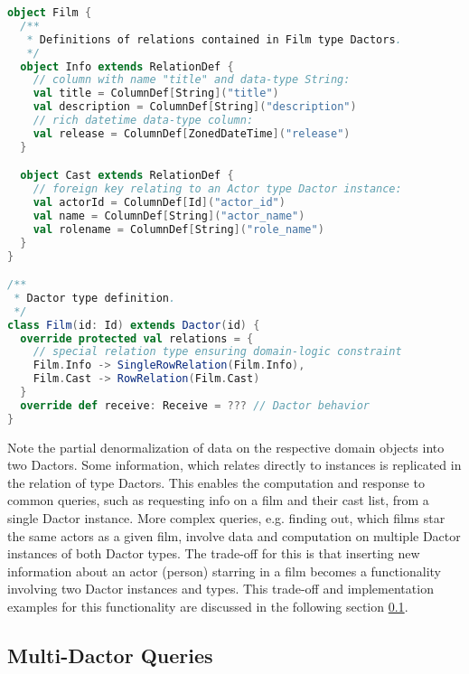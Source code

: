 \begin{lstlisting}[caption=Film Dactor type definition using the actordb framework, label=lst:film_definition, language=Scala]
object Film {
  /**
   * Definitions of relations contained in Film type Dactors.
   */
  object Info extends RelationDef {
    // column with name "title" and data-type String:
    val title = ColumnDef[String]("title")
    val description = ColumnDef[String]("description")
    // rich datetime data-type column:
    val release = ColumnDef[ZonedDateTime]("release")
  }

  object Cast extends RelationDef {
    // foreign key relating to an Actor type Dactor instance:
    val actorId = ColumnDef[Id]("actor_id")
    val name = ColumnDef[String]("actor_name")
    val rolename = ColumnDef[String]("role_name")
  }
} 

/**
 * Dactor type definition.
 */
class Film(id: Id) extends Dactor(id) {
  override protected val relations = {
    // special relation type ensuring domain-logic constraint
    Film.Info -> SingleRowRelation(Film.Info),
    Film.Cast -> RowRelation(Film.Cast)
  }
  override def receive: Receive = ??? // Dactor behavior
}
\end{lstlisting}

%

Note the partial denormalization of data on the respective domain objects into two Dactors.
Some information, which relates directly to  instances is replicated in the  relation of  type Dactors.
This enables the computation and response to common queries, such as requesting info on a film and their cast list, from a single Dactor instance.
More complex queries, e.g. finding out, which films star the same actors as a given film, involve data and computation on multiple Dactor instances of both Dactor types.
The trade-off for this is that inserting new information about an actor (person) starring in a film becomes a functionality involving two Dactor instances and types.
This trade-off and implementation examples for this functionality are discussed in the following section \ref{subsec:multi_dactor_queries}.


\subsection{Multi-Dactor Queries}\label{subsec:multi_dactor_queries}

